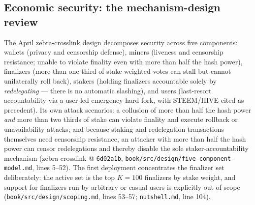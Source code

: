 \documentclass[11pt,a4paper]{article}
\theoremstyle{definition}
\begin{document}
\subsection{Economic security: the mechanism-design review}
\label{sec:xl-econ}

The April zebra-crosslink design decomposes security across five components:
wallets (privacy and censorship defense), miners (liveness and
censorship resistance; unable to violate finality even with more than
half the hash power), finalizers (more than one third of stake-weighted
votes can stall but cannot unilaterally roll back), stakers (holding
finalizers accountable solely by \emph{redelegating} --- there is no
automatic slashing), and users (last-resort accountability via a user-led emergency
hard fork, with STEEM/HIVE cited as precedent). Its own attack scenarios:
a collusion of more than half the hash power \emph{and} more than two
thirds of stake can violate finality and execute rollback or
unavailability attacks; and because staking and redelegation transactions
themselves need censorship resistance, an attacker with more than half
the hash power can censor redelegations and thereby disable the sole
staker-accountability mechanism (zebra-crosslink @ \texttt{6d02a1b},
\texttt{book/src/design/five-component-model.md}, lines 5--52). The first
deployment concentrates the finalizer set deliberately: the active set is
the top $K = 100$ finalizers by stake weight, and support for
finalizers run by arbitrary or casual users is explicitly out of scope
(\texttt{book/src/design/scoping.md}, lines 53--57;
\texttt{nutshell.md}, line 104).
\end{document}
